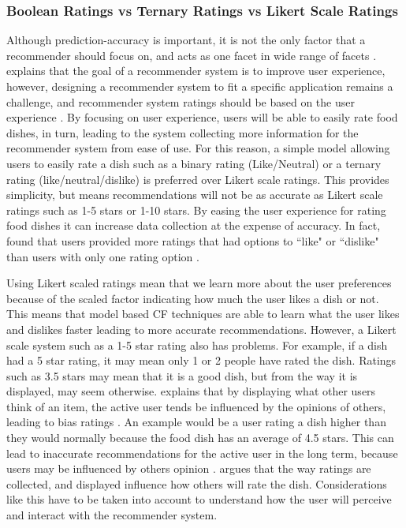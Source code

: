 \subsubsection{Boolean Ratings vs Ternary Ratings vs Likert Scale Ratings}

Although prediction-accuracy is important, it is not the only factor that a recommender should focus on, and acts as one facet in wide range of facets \cite{martin2009recsys}. \citeauthor{martin2009recsys} explains that the goal of a recommender system is to improve user experience, however, designing a recommender system to fit a specific application remains a challenge, and recommender system ratings should be based on the user experience \cite{martin2009recsys}. By focusing on user experience, users will be able to easily rate food dishes, in turn, leading to the system collecting more information for the recommender system from ease of use. For this reason, a simple model allowing users to easily rate a dish such as a binary rating (Like/Neutral) or a ternary rating (like/neutral/dislike) is preferred over Likert scale ratings. This provides simplicity, but means recommendations will not be as accurate as Likert scale ratings such as 1-5 stars or 1-10 stars. By easing the user experience for rating food dishes it can increase data collection at the expense of accuracy. In fact, \citeauthor{movieratings} found that users provided more ratings that had options to ``like" or ``dislike" than users with only one rating option \cite{schafer2007collaborative, movieratings}. 

Using Likert scaled ratings mean that we learn more about the user preferences because of the scaled factor indicating how much the user likes a dish or not. This means that model based CF techniques are able to learn what the user likes and dislikes faster leading to more accurate recommendations. However, a Likert scale system such as a 1-5 star rating also has problems. For example, if a dish had a 5 star rating, it may mean only 1 or 2 people have rated the dish. Ratings such as 3.5 stars may mean that it is a good dish, but from the way it is displayed, may seem otherwise. \citeauthor{interface} explains that by displaying what other users think of an item, the active user tends be influenced by the opinions of others, leading to bias ratings \cite{interface}. An example would be a user rating a dish higher than they would normally because the food dish has an average of 4.5 stars. This can lead to inaccurate recommendations for the active user in the long term, because users may be influenced by others opinion \cite{interface}. \citeauthor{interface} argues that the way ratings are collected, and displayed influence how others will rate the dish. Considerations like this have to be taken into account to understand how the user will perceive and interact with the recommender system.  

